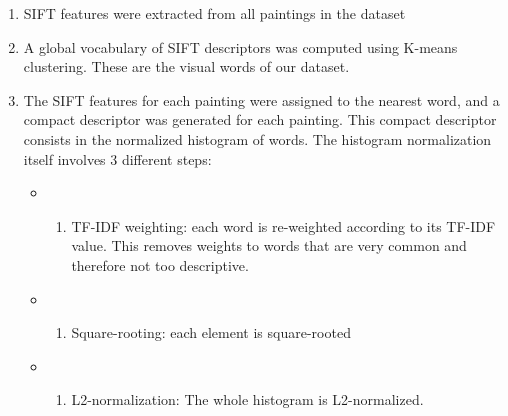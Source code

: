 \documentclass[11pt]{article}
\providecommand{\tightlist}{%
      \setlength{\itemsep}{0pt}\setlength{\parskip}{0pt}}
\begin{document}
\begin{enumerate}
\def\labelenumi{\arabic{enumi}.}
\tightlist
\item
  SIFT features were extracted from all paintings in the dataset
\item
  A global vocabulary of SIFT descriptors was computed using K-means
  clustering. These are the visual words of our dataset.
\item
  The SIFT features for each painting were assigned to the nearest word,
  and a compact descriptor was generated for each painting. This compact
  descriptor consists in the normalized histogram of words. The
  histogram normalization itself involves 3 different steps:

  \begin{itemize}
  \item
    \begin{enumerate}
    \def\labelenumii{\alph{enumii})}
    \tightlist
    \item
      TF-IDF weighting: each word is re-weighted according to its TF-IDF
      value. This removes weights to words that are very common and
      therefore not too descriptive.
    \end{enumerate}
  \item
    \begin{enumerate}
    \def\labelenumii{\alph{enumii})}
    \setcounter{enumii}{1}
    \tightlist
    \item
      Square-rooting: each element is square-rooted
    \end{enumerate}
  \item
    \begin{enumerate}
    \def\labelenumii{\alph{enumii})}
    \setcounter{enumii}{2}
    \tightlist
    \item
      L2-normalization: The whole histogram is L2-normalized.
    \end{enumerate}
  \end{itemize}
\end{enumerate}
\end{document}
